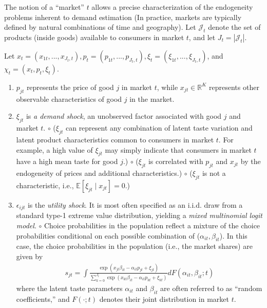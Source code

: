 \documentclass[11pt]{elegantbook}
\begin{document}
The notion of a “market” $t$ allows a precise characterization of the endogeneity problems inherent to demand estimation (In practice, markets are typically defined by natural combinations of time and geography). Let $\mathcal{J}_t$ denote the set of products (inside goods) available to consumers in market $t$, and let $J_t=|\mathcal{J}_t|$.

Let $x_t=(x_{1t},...,x_{J_t,t}), p_t=(p_{1t},...,p_{J_t,t}), \xi_t=(\xi_{1t},..., \xi_{J_t,t})$, and $\chi_t=(x_t,p_t,\xi_t)$.

\begin{enumerate}
    \item $p_{jt}$ represents the price of good $j$ in market $t$, while $x_{jt}\in \mathbb{R}^K$ represents other observable characteristics of good $j$ in the market.
    \item $\xi_{jt}$ is \textit{ a demand shock}, an unobserved factor associated with good $j$ and market $t$.
    \subitem $\circ$ ($\xi_{jt}$ can represent any combination of latent taste variation and latent product characteristics common to consumers in market $t$. For example, a high value of $\xi_{jt}$ may simply indicate that consumers in market $t$ have a high mean taste for good $j$.)
    \subitem $\circ$ ($\xi_{jt}$ is correlated with $p_{jt}$ and $x_{jt}$ by the endogeneity of prices and additional characteristics.)
    \subitem $\circ$ ($\xi_{jt}$ is not a characteristic, i.e., $\mathbb{E}[\xi_{jt}\mid x_{jt}]=0$.)
    \item $\epsilon_{ijt}$ is the \textit{utility shock}. It is most often specified as an i.i.d. draw from a standard type-1 extreme value distribution, yielding a \textit{mixed multinomial logit model}.
    \subitem $\circ$ Choice probabilities in the population reflect a mixture of the choice probabilities conditional on each possible combination of ($\alpha_{it},\beta_{it}$). In this case, the choice probabilities in the population (i.e., the market shares) are given by
    \begin{equation}
        \begin{aligned}
            s_{jt}=\int \frac{\exp(x_{jt}\beta_{it}-\alpha_{it}p_{jt}+\xi_{jt})}{\sum_{k=0}^{J_t}\exp(x_{kt}\beta_{it}-\alpha_{it}p_{kt}+\xi_{kt})}d F(\alpha_{it},\beta_{it};t)
        \end{aligned}
        \label{eq:mixed_multinomial_logit}
    \end{equation}
    where the latent taste parameters $\alpha_{it}$ and $\beta_{it}$ are often referred to as ``random coefficients,'' and $F(\cdot;t)$ denotes their joint distribution in market $t$.

\end{enumerate}
\end{document}
